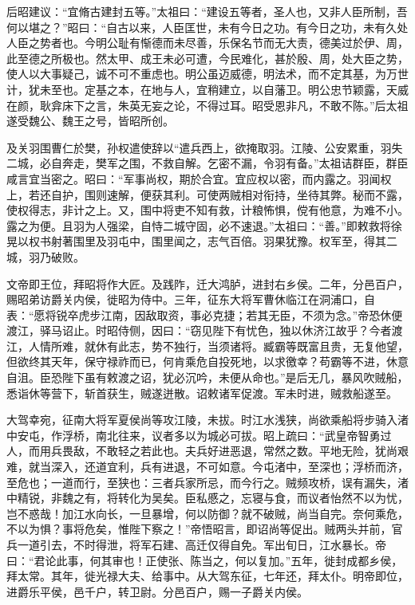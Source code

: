 \documentclass[12pt,UTF8]{ctexbook}
\begin{document}
后昭建议：“宜脩古建封五等。”太祖曰：“建设五等者，圣人也，又非人臣所制，吾何以堪之？”昭曰：“自古以来，人臣匡世，未有今日之功。有今日之功，未有久处人臣之势者也。今明公耻有惭德而未尽善，乐保名节而无大责，德美过於伊、周，此至德之所极也。然太甲、成王未必可遭，今民难化，甚於殷、周，处大臣之势，使人以大事疑己，诚不可不重虑也。明公虽迈威德，明法术，而不定其基，为万世计，犹未至也。定基之本，在地与人，宜稍建立，以自藩卫。明公忠节颖露，天威在颜，耿弇床下之言，朱英无妄之论，不得过耳。昭受恩非凡，不敢不陈。”后太祖遂受魏公、魏王之号，皆昭所创。

及关羽围曹仁於樊，孙权遣使辞以“遣兵西上，欲掩取羽。江陵、公安累重，羽失二城，必自奔走，樊军之围，不救自解。乞密不漏，令羽有备。”太祖诘群臣，群臣咸言宜当密之。昭曰：“军事尚权，期於合宜。宜应权以密，而内露之。羽闻权上，若还自护，围则速解，便获其利。可使两贼相对衔持，坐待其弊。秘而不露，使权得志，非计之上。又，围中将吏不知有救，计粮怖惧，傥有他意，为难不小。露之为便。且羽为人强梁，自恃二城守固，必不速退。”太祖曰：“善。”即敕救将徐晃以权书射著围里及羽屯中，围里闻之，志气百倍。羽果犹豫。权军至，得其二城，羽乃破败。

文帝即王位，拜昭将作大匠。及践阼，迁大鸿胪，进封右乡侯。二年，分邑百户，赐昭弟访爵关内侯，徙昭为侍中。三年，征东大将军曹休临江在洞浦口，自表：“愿将锐卒虎步江南，因敌取资，事必克捷；若其无臣，不须为念。”帝恐休便渡江，驿马诏止。时昭侍侧，因曰：“窃见陛下有忧色，独以休济江故乎？今者渡江，人情所难，就休有此志，势不独行，当须诸将。臧霸等既富且贵，无复他望，但欲终其天年，保守禄祚而已，何肯乘危自投死地，以求徼幸？苟霸等不进，休意自沮。臣恐陛下虽有敕渡之诏，犹必沉吟，未便从命也。”是后无几，暴风吹贼船，悉诣休等营下，斩首获生，贼遂迸散。诏敕诸军促渡。军未时进，贼救船遂至。

大驾幸宛，征南大将军夏侯尚等攻江陵，未拔。时江水浅狭，尚欲乘船将步骑入渚中安屯，作浮桥，南北往来，议者多以为城必可拔。昭上疏曰：“武皇帝智勇过人，而用兵畏敌，不敢轻之若此也。夫兵好进恶退，常然之数。平地无险，犹尚艰难，就当深入，还道宜利，兵有进退，不可如意。今屯渚中，至深也；浮桥而济，至危也；一道而行，至狭也：三者兵家所忌，而今行之。贼频攻桥，误有漏失，渚中精锐，非魏之有，将转化为吴矣。臣私慼之，忘寝与食，而议者怡然不以为忧，岂不惑哉！加江水向长，一旦暴增，何以防御？就不破贼，尚当自完。奈何乘危，不以为惧？事将危矣，惟陛下察之！”帝悟昭言，即诏尚等促出。贼两头并前，官兵一道引去，不时得泄，将军石建、高迁仅得自免。军出旬日，江水暴长。帝曰：“君论此事，何其审也！正使张、陈当之，何以复加。”五年，徙封成都乡侯，拜太常。其年，徙光禄大夫、给事中。从大驾东征，七年还，拜太仆。明帝即位，进爵乐平侯，邑千户，转卫尉。分邑百户，赐一子爵关内侯。
\end{document}
